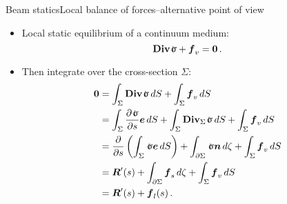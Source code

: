 \begin{frame}{Beam statics}{Local balance of forces--alternative point of view}

\begin{itemize}
\item Local static equilibrium of a continuum medium:
\begin{displaymath}
\Div\stress+\fv_v=\bzero\,.
\end{displaymath}
\item Then integrate over the cross-section $\Sigma$:
\begin{displaymath}
\begin{split}
\bzero &=\int_\Sigma\Div\stress\,\id S+\int_\Sigma\fv_v\,\id S \\
&=\int_\Sigma\frac{\partial\stress}{\partial s}\ev\,\id S + \int_\Sigma\Div_\Sigma\stress\,\id S +\int_\Sigma\fv_v\,\id S \\
&=\frac{\partial}{\partial s}\left(\int_\Sigma\stress\ev\,\id S\right)+\int_{\partial\Sigma}\stress\nv\,\id\zeta +\int_\Sigma\fv_v\,\id S \\
&=\Fres'(s)+ \int_{\partial\Sigma}\fv_s\,\id\zeta +\int_\Sigma\fv_v\,\id S \\
&=\Fres'(s)+\fv_l(s)\,.
\end{split}
\end{displaymath}
\end{itemize}

\end{frame}

